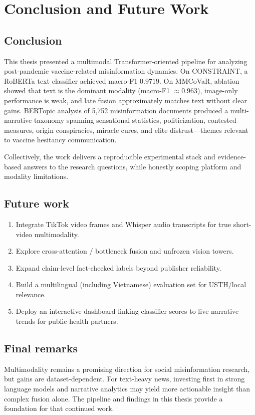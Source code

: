 \chapter{Conclusion and Future Work}
\label{ch:conc}

\section{Conclusion}

This thesis presented a multimodal Transformer-oriented pipeline for analyzing post-pandemic vaccine-related misinformation dynamics.
On CONSTRAINT, a RoBERTa text classifier achieved macro-F1 $0.9719$.
On MMCoVaR, ablation showed that text is the dominant modality (macro-F1 $\approx 0.963$), image-only performance is weak, and late fusion approximately matches text without clear gains.
BERTopic analysis of 5{,}752 misinformation documents produced a multi-narrative taxonomy spanning sensational statistics, politicization, contested measures, origin conspiracies, miracle cures, and elite distrust---themes relevant to vaccine hesitancy communication.

Collectively, the work delivers a reproducible experimental stack and evidence-based answers to the research questions, while honestly scoping platform and modality limitations.

\section{Future work}

\begin{enumerate}
  \item Integrate TikTok video frames and Whisper audio transcripts for true short-video multimodality.
  \item Explore cross-attention / bottleneck fusion and unfrozen vision towers.
  \item Expand claim-level fact-checked labels beyond publisher reliability.
  \item Build a multilingual (including Vietnamese) evaluation set for USTH/local relevance.
  \item Deploy an interactive dashboard linking classifier scores to live narrative trends for public-health partners.
\end{enumerate}

\section{Final remarks}

Multimodality remains a promising direction for social misinformation research, but gains are dataset-dependent.
For text-heavy news, investing first in strong language models and narrative analytics may yield more actionable insight than complex fusion alone.
The pipeline and findings in this thesis provide a foundation for that continued work.
